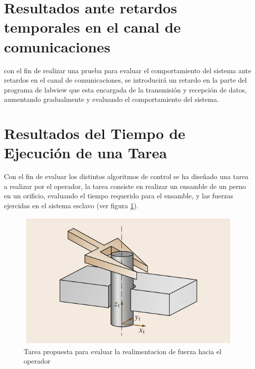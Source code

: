 
\section{Resultados ante retardos temporales en el canal de comunicaciones}
con el fin de realizar una prueba para evaluar el comportamiento del sistema ante retardos en el canal de comunicaciones, se introducirá un retardo en la parte del programa de labview que esta encargada de la transmisión y recepción de datos, aumentando gradualmente y evaluando el comportamiento del sistema.







\newpage
\section{Resultados del Tiempo de Ejecución de una Tarea}
Con el fin de evaluar los distintos algoritmos de control se ha diseñado una tarea a realizar por el operador, la tarea consiste en realizar un ensamble de un perno en un orificio, evaluando el tiempo requerido para el ensamble, y las fuerzas ejercidas en el sistema esclavo (ver figura \ref{fig:task}).



\begin{figure}
\centering
\label{fig:task}
\includegraphics[scale=0.5]{FiguresP/task}
\caption{Tarea propuesta para evaluar la realimentacion de fuerza hacia el operador}
\end{figure}

